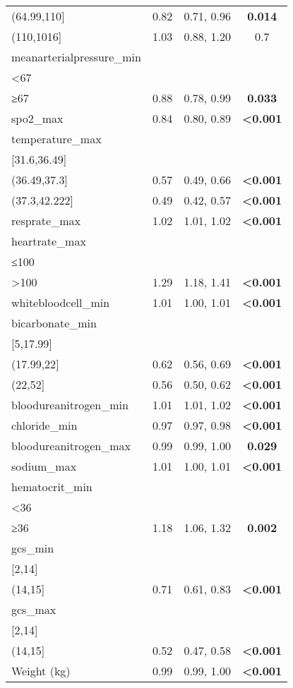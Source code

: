 \documentclass[
]{article}
\begin{document}
\begin{longtable}[]{@{}lccc@{}}
(64.99,110{]} & 0.82 & 0.71, 0.96 & \textbf{0.014} \\
(110,1016{]} & 1.03 & 0.88, 1.20 & 0.7 \\
meanarterialpressure\_min & & & \\
\textless67 & & & \\
≥67 & 0.88 & 0.78, 0.99 & \textbf{0.033} \\
spo2\_max & 0.84 & 0.80, 0.89 & \textbf{\textless0.001} \\
temperature\_max & & & \\
{[}31.6,36.49{]} & & & \\
(36.49,37.3{]} & 0.57 & 0.49, 0.66 & \textbf{\textless0.001} \\
(37.3,42.222{]} & 0.49 & 0.42, 0.57 & \textbf{\textless0.001} \\
resprate\_max & 1.02 & 1.01, 1.02 & \textbf{\textless0.001} \\
heartrate\_max & & & \\
≤100 & & & \\
\textgreater100 & 1.29 & 1.18, 1.41 & \textbf{\textless0.001} \\
whitebloodcell\_min & 1.01 & 1.00, 1.01 & \textbf{\textless0.001} \\
bicarbonate\_min & & & \\
{[}5,17.99{]} & & & \\
(17.99,22{]} & 0.62 & 0.56, 0.69 & \textbf{\textless0.001} \\
(22,52{]} & 0.56 & 0.50, 0.62 & \textbf{\textless0.001} \\
bloodureanitrogen\_min & 1.01 & 1.01, 1.02 & \textbf{\textless0.001} \\
chloride\_min & 0.97 & 0.97, 0.98 & \textbf{\textless0.001} \\
bloodureanitrogen\_max & 0.99 & 0.99, 1.00 & \textbf{0.029} \\
sodium\_max & 1.01 & 1.00, 1.01 & \textbf{\textless0.001} \\
hematocrit\_min & & & \\
\textless36 & & & \\
≥36 & 1.18 & 1.06, 1.32 & \textbf{0.002} \\
gcs\_min & & & \\
{[}2,14{]} & & & \\
(14,15{]} & 0.71 & 0.61, 0.83 & \textbf{\textless0.001} \\
gcs\_max & & & \\
{[}2,14{]} & & & \\
(14,15{]} & 0.52 & 0.47, 0.58 & \textbf{\textless0.001} \\
Weight (kg) & 0.99 & 0.99, 1.00 & \textbf{\textless0.001} \\
\end{longtable}
\end{document}
